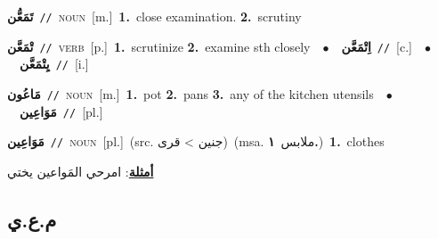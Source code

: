 \documentclass[10pt,a4paper,twoside]{article} %
\begin{document}
\begin{multicols}{2}
{\setlength\topsep{0pt}\textbf{\foreignlanguage{arabic}{تَمَعُّن}}\ {\color{gray}\texttt{//}\color{black}}\ \textsc{noun}\ [m.]\ \textbf{1.}~close examination.  \textbf{2.}~scrutiny\ } \vspace{2mm}

{\setlength\topsep{0pt}\textbf{\foreignlanguage{arabic}{تْمَعَّن}}\ {\color{gray}\texttt{//}\color{black}}\ \textsc{verb}\ [p.]\ \textbf{1.}~scrutinize  \textbf{2.}~examine sth closely\ \ $\bullet$\ \ \setlength\topsep{0pt}\textbf{\foreignlanguage{arabic}{اِتْمَعَّن}}\ {\color{gray}\texttt{//}\color{black}}\ [c.]\ \ $\bullet$\ \ \setlength\topsep{0pt}\textbf{\foreignlanguage{arabic}{يِتْمَعَّن}}\ {\color{gray}\texttt{//}\color{black}}\ [i.]\ } \vspace{2mm}

{\setlength\topsep{0pt}\textbf{\foreignlanguage{arabic}{مَاعُون}}\ {\color{gray}\texttt{//}\color{black}}\ \textsc{noun}\ [m.]\ \textbf{1.}~pot  \textbf{2.}~pans  \textbf{3.}~any of the kitchen utensils\ \ $\bullet$\ \ \setlength\topsep{0pt}\textbf{\foreignlanguage{arabic}{مَوَاعِين}}\ {\color{gray}\texttt{//}\color{black}}\ [pl.]\ } \vspace{2mm}

{\setlength\topsep{0pt}\textbf{\foreignlanguage{arabic}{مَوَاعِين}}\ {\color{gray}\texttt{//}\color{black}}\ \textsc{noun}\ [pl.]\ (src. \color{gray}\foreignlanguage{arabic}{جنين > قرى}\color{black})\ \color{gray}(msa. \foreignlanguage{arabic}{ملابس}~\foreignlanguage{arabic}{\textbf{١.}})\color{black}\ \textbf{1.}~clothes\  \begin{flushright}\color{gray}\foreignlanguage{arabic}{\textbf{\underline{\foreignlanguage{arabic}{أمثلة}}}: امرحي المَواعين يختي}\end{flushright}\color{black}} \vspace{2mm}

\vspace{-3mm}
\subsection*{\color{blue}\foreignlanguage{arabic}{م.ع.ي}\color{blue}{}} 


\end{multicols}
\end{document}
